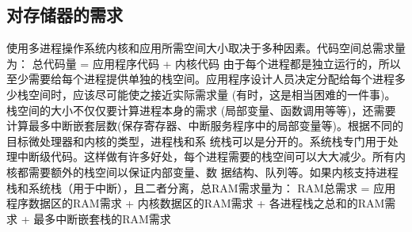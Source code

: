 \documentclass[a4paper,12pt]{report}
\begin{document}
\begin{appendix}
\section{对存储器的需求}
\begin{spacing}{1.5}
   使用多进程操作系统内核和应用所需空间大小取决于多种因素。代码空间总需求量为：
   总代码量 = 应用程序代码 + 内核代码
    由于每个进程都是独立运行的，所以至少需要给每个进程提供单独的栈空间。应用程序设计人员决定分配给每个进程多少栈空间时，应该尽可能使之接近实际需求量 (有时，这是相当困难的一件事)。栈空间的大小不仅仅要计算进程本身的需求 (局部变量、函数调用等等)，还需要计算最多中断嵌套层数(保存寄存器、中断服务程序中的局部变量等)。根据不同的目标微处理器和内核的类型，进程栈和系 统栈可以是分开的。系统栈专门用于处理中断级代码。这样做有许多好处，每个进程需要的栈空间可以大大减少。所有内核都需要额外的栈空间以保证内部变量、数 据结构、队列等。如果内核支持进程栈和系统栈（用于中断），且二者分离，总RAM需求量为：
   RAM总需求 = 应用程序数据区的RAM需求 + 内核数据区的RAM需求 + 各进程栈之总和的RAM需求 + 最多中断嵌套栈的RAM需求

\end{spacing}




\end{appendix}
		
\end{document}
